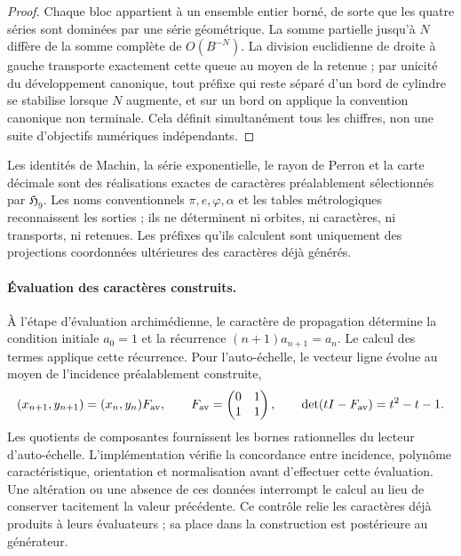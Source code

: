 \begin{proof}
Chaque bloc appartient à un ensemble entier borné, de sorte que les quatre
séries sont dominées par une série géométrique. La somme partielle jusqu'à \(N\)
diffère de la somme complète de \(O(B^{-N})\). La division euclidienne de
droite à gauche transporte exactement cette queue au moyen de la retenue ;
par unicité du développement canonique, tout préfixe qui reste séparé d'un
bord de cylindre se stabilise lorsque \(N\) augmente, et sur un bord
on applique la convention canonique non terminale. Cela définit simultanément
tous les chiffres, non une suite d'objectifs numériques indépendants.
\end{proof}

\begin{corollary}
\label{cor:c27-generacion-reconocimiento}
Les identités de Machin, la série exponentielle, le rayon de Perron et la carte
décimale sont des réalisations exactes de caractères préalablement sélectionnés
par \(\mathfrak H_9\). Les noms conventionnels \(\pi,e,\varphi,\alpha\)
et les tables métrologiques reconnaissent les sorties ; ils ne déterminent ni orbites,
ni caractères, ni transports, ni retenues. Les préfixes qu'ils calculent sont uniquement
des projections coordonnées ultérieures des caractères déjà générés.
\end{corollary}

\paragraph{Évaluation des caractères construits.}
À l'étape d'évaluation archimédienne, le caractère de propagation
détermine la condition initiale \(a_0=1\) et la récurrence
\((n+1)a_{n+1}=a_n\). Le calcul des termes applique cette récurrence.
Pour l'auto-échelle, le vecteur ligne évolue au moyen de l'incidence
préalablement construite,
\[
 (x_{n+1},y_{n+1})=(x_n,y_n)F_{\rm av},
 \qquad
 F_{\rm av}=\begin{pmatrix}0&1\\1&1\end{pmatrix},
 \qquad
 \det(tI-F_{\rm av})=t^2-t-1.
\]
Les quotients de composantes fournissent les bornes rationnelles du
lecteur d'auto-échelle. L'implémentation vérifie la concordance entre
incidence, polynôme caractéristique, orientation et normalisation avant
d'effectuer cette évaluation. Une altération ou une absence de ces données
interrompt le calcul au lieu de conserver tacitement la valeur
précédente. Ce contrôle relie les caractères déjà produits à leurs
évaluateurs ; sa place dans la construction est postérieure au générateur.
